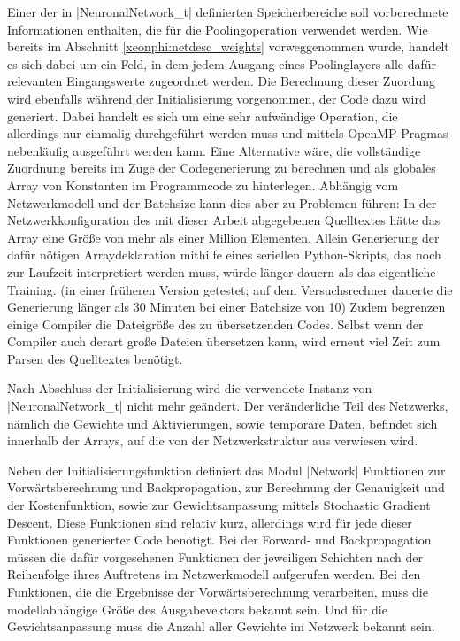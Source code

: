 \documentclass[../main.tex]{subfiles}
\begin{document}
Einer der in |NeuronalNetwork_t| definierten Speicherbereiche soll vorberechnete Informationen enthalten, die für die Poolingoperation verwendet werden. Wie bereits im Abschnitt \ref{xeonphi:netdesc_weights} vorweggenommen wurde, handelt es sich dabei um ein Feld, in dem jedem Ausgang eines Poolinglayers alle dafür relevanten Eingangswerte zugeordnet werden. Die Berechnung dieser Zuordung wird ebenfalls während der Initialisierung vorgenommen, der Code dazu wird generiert. Dabei handelt es sich um eine sehr aufwändige Operation, die allerdings nur einmalig durchgeführt werden muss und mittels OpenMP-Pragmas nebenläufig ausgeführt werden kann. Eine Alternative wäre, die vollständige Zuordnung bereits im Zuge der Codegenerierung zu berechnen und als globales Array von Konstanten im Programmcode zu hinterlegen. Abhängig vom Netzwerkmodell und der Batchsize kann dies aber zu Problemen führen: In der Netzwerkkonfiguration des mit dieser Arbeit abgegebenen Quelltextes hätte das Array eine Größe von mehr als einer Million Elementen. Allein Generierung der dafür nötigen Arraydeklaration mithilfe eines seriellen Python-Skripts, das noch zur Laufzeit interpretiert werden muss, würde länger dauern als das eigentliche Training. (in einer früheren Version getestet; auf dem Versuchsrechner dauerte die Generierung länger als 30 Minuten bei einer Batchsize von 10) Zudem begrenzen einige Compiler die Dateigröße des zu übersetzenden Codes. Selbst wenn der Compiler auch derart große Dateien übersetzen kann, wird erneut viel Zeit zum Parsen des Quelltextes benötigt. 

Nach Abschluss der Initialisierung wird die verwendete Instanz von |NeuronalNetwork_t| nicht mehr geändert. Der veränderliche Teil des Netzwerks, nämlich die Gewichte und Aktivierungen, sowie temporäre Daten, befindet sich innerhalb der Arrays, auf die von der Netzwerkstruktur aus verwiesen wird. 

Neben der Initialisierungsfunktion definiert das Modul |Network| Funktionen zur Vorwärtsberechnung und Backpropagation, zur Berechnung der Genauigkeit und der Kostenfunktion, sowie zur Gewichtsanpassung mittels Stochastic Gradient Descent. Diese Funktionen sind relativ kurz, allerdings wird für jede dieser Funktionen generierter Code benötigt. Bei der Forward- und Backpropagation müssen die dafür vorgesehenen Funktionen der jeweiligen Schichten nach der Reihenfolge ihres Auftretens im Netzwerkmodell aufgerufen werden. Bei den Funktionen, die die Ergebnisse der Vorwärtsberechnung verarbeiten, muss die modellabhängige Größe des Ausgabevektors bekannt sein. Und für die Gewichtsanpassung muss die Anzahl aller Gewichte im Netzwerk bekannt sein. 
\end{document}
